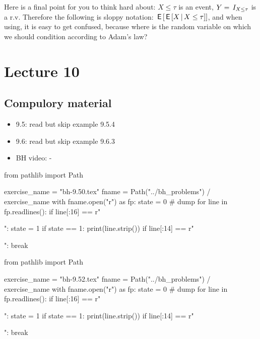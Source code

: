 \begin{exercise}
\begin{solution}
Here is a final point for you to think hard about: ${X\leq \tau}$ is an event, $Y=\,I_{X \leq \tau}$ is a r.v. Therefore the following is sloppy notation: $\,\mathsf{E}\left[\,\mathsf{E}\left[X\,\middle|\, X\leq \tau\right]\right]$, and when using, it is easy to get confused, because where is the random variable  on which we  should condition according to Adam's law?
\end{solution}
\end{exercise}



\section{Lecture 10}

\subsection{Compulory material}
\label{sec:compulory-material}


\begin{itemize}
\item 9.5: read but skip example 9.5.4
\item 9.6: read but skip example 9.6.3
\item BH video: -
\end{itemize}



\begin{pycode}
from pathlib import Path

exercise_name = "bh-9.50.tex"
fname = Path("../bh_problems") / exercise_name
with fname.open("r") as fp:
    state = 0  # dump
    for line in fp.readlines():
        if line[:16] == r"\begin{exercise}":
            state = 1
        if state == 1:
            print(line.strip())
        if line[:14] == r"\end{exercise}":
            break
\end{pycode}


\begin{pycode}
from pathlib import Path

exercise_name = "bh-9.52.tex"
fname = Path("../bh_problems") / exercise_name
with fname.open("r") as fp:
    state = 0  # dump
    for line in fp.readlines():
        if line[:16] == r"\begin{exercise}":
            state = 1
        if state == 1:
            print(line.strip())
        if line[:14] == r"\end{exercise}":
            break
\end{pycode}


